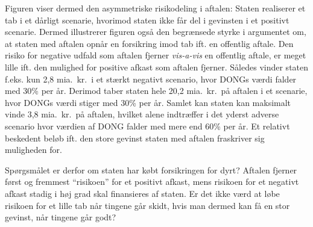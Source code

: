 \documentclass{article}
\begin{document}
Figuren viser dermed den asymmetriske risikodeling i aftalen: Staten realiserer et tab i et dårligt scenarie, hvorimod staten ikke får del i gevinsten i et positivt scenarie. Dermed illustrerer figuren også den begrænsede styrke i argumentet om, at staten med aftalen opnår en forsikring imod tab ift. en offentlig aftale. Den risiko for negative udfald som aftalen fjerner \emph{vis-a-vis} en offentlig aftale, er meget lille ift. den mulighed for positive afkast som aftalen fjerner. Således vinder staten f.eks. kun 2,8 mia.\ kr.\ i et stærkt negativt scenario, hvor DONGs værdi falder med 30\% per år. Derimod taber staten hele 20,2 mia.\ kr.\ på aftalen i et scenarie, hvor DONGs værdi stiger med 30\% per år. Samlet kan staten kan maksimalt vinde 3,8 mia.\ kr.\ på aftalen, hvilket alene indtræffer i det yderst adverse scenario hvor værdien af DONG falder med mere end 60\% per år. Et relativt beskedent beløb ift. den store gevinst staten med aftalen fraskriver sig muligheden for.

Spørgsmålet er derfor om staten har købt forsikringen for dyrt? Aftalen fjerner først og fremmest \enquote{risikoen} for et positivt afkast, mens risikoen for et negativt afkast stadig i høj grad skal finansieres af staten. Er det ikke værd at løbe risikoen for et lille tab når tingene går skidt, hvis man dermed kan få en stor gevinst, når tingene går godt?
\end{document}
